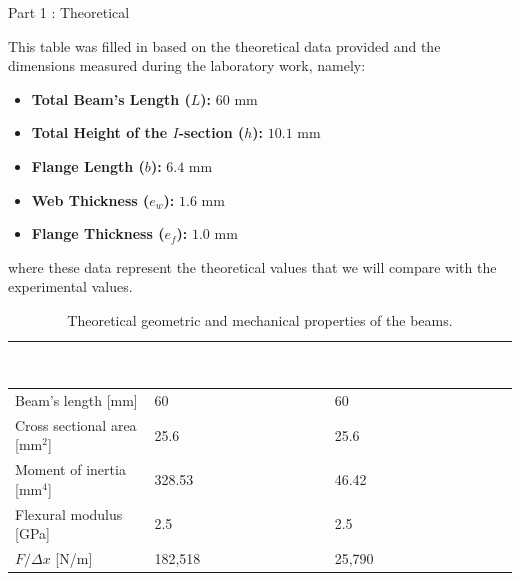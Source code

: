 \documentclass[12pt, a4paper]{article}
\begin{document}
\clearpage
\begin{tcolorbox}[
    colback=MainBlue!5,
    colframe=MainBlue,
    arc=3mm,
    boxrule=1pt,
    halign=center,
    fontupper=\Large\bfseries\color{DarkBlue}
]
Part 1 : Theoretical
\end{tcolorbox}
\vspace{0.3cm}
\noindent This table was filled in based on the theoretical data provided and the dimensions measured during the laboratory work, namely:
\begin{itemize}[noitemsep, topsep=4pt]
    \item \textbf{Total Beam's Length ($L$):} $60\text{ mm}$
    \item \textbf{Total Height of the $I$-section ($h$):} $10.1\text{ mm}$
    \item \textbf{Flange Length ($b$):} $6.4\text{ mm}$
    \item \textbf{Web Thickness ($e_w$):} $1.6\text{ mm}$
    \item \textbf{Flange Thickness ($e_f$):} $1.0\text{ mm}$
\end{itemize}
where these data represent the theoretical values that we will compare with the experimental values.
\vspace{0.4cm}
\begin{table}[H]
\centering
{}
\begin{tabular}{p{5cm} p{5.2cm} p{5.2cm}}
\toprule

\rowcolor{MainBlue}
\textcolor{white}{\textbf{Properties}} &
\textcolor{white}{\textbf{I-beam (bending about the $z$ axis)}} &
\textcolor{white}{\textbf{H-beam (bending about the $y$ axis)}} \\

\midrule

Beam's length [mm] & 60 & 60 \\

Cross sectional area [mm$^2$] & 25.6 & 25.6 \\

Moment of inertia [mm$^4$] & 328.53 &  46.42 \\

Flexural modulus [GPa] & 2.5 & 2.5 \\

$F/\Delta x$ [N/m] & 182,518 & 25,790 \\

\bottomrule
\end{tabular}

\caption{Theoretical geometric and mechanical properties of the beams.}
\label{tab:theoretical_properties}
\end{table}
\end{document}
